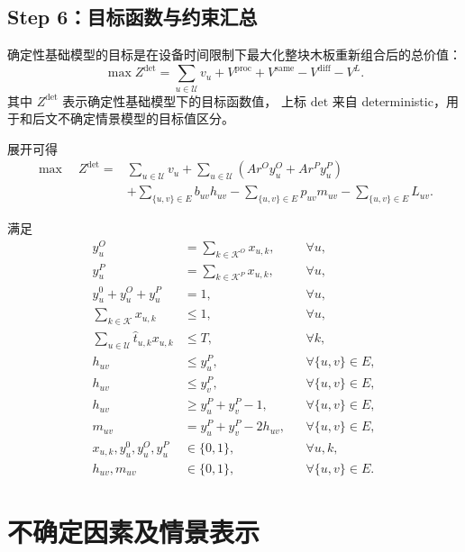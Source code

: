 ﻿\documentclass[UTF8,12pt,a4paper]{ctexart}
\begin{document}
\subsection{Step 6：目标函数与约束汇总}

\begin{description}[leftmargin=2em,labelsep=0.5em,itemsep=0.8em]
  \item[\textbf{目标函数：}]
确定性基础模型的目标是在设备时间限制下最大化整块木板重新组合后的总价值：
\[
\boxed{
\max Z^{\mathrm{det}}
=
\sum_{u\in\mathcal U}v_u
+
V^{\mathrm{proc}}
+
V^{\mathrm{same}}
-
V^{\mathrm{diff}}
-
V^L.
}
\]
其中 \(Z^{\mathrm{det}}\) 表示确定性基础模型下的目标函数值，
上标 \(\mathrm{det}\) 来自 deterministic，用于和后文不确定情景模型的目标值区分。

  \item[\textbf{展开形式：}]
展开可得
\[
\begin{aligned}
\max\quad
Z^{\mathrm{det}}
={}&
\sum_{u\in\mathcal U}v_u
+
\sum_{u\in\mathcal U}
\left(
A r^O y_u^O+A r^P y_u^P
\right)\\
&+
\sum_{\{u,v\}\in E}
b_{uv}h_{uv}
-
\sum_{\{u,v\}\in E}
p_{uv}m_{uv}
-
\sum_{\{u,v\}\in E}
L_{uv}.
\end{aligned}
\]

  \item[\textbf{约束汇总：}]
满足
\[
\begin{aligned}
y_u^O&=\sum_{k\in\mathcal K^O}x_{u,k},
&&\forall u,\\
y_u^P&=\sum_{k\in\mathcal K^P}x_{u,k},
&&\forall u,\\
y_u^0+y_u^O+y_u^P&=1,
&&\forall u,\\
\sum_{k\in\mathcal K}x_{u,k}&\le1,
&&\forall u,\\
\sum_{u\in\mathcal U}\widehat t_{u,k}x_{u,k}&\le T,
&&\forall k,\\
h_{uv}&\le y_u^P,
&&\forall\{u,v\}\in E,\\
h_{uv}&\le y_v^P,
&&\forall\{u,v\}\in E,\\
h_{uv}&\ge y_u^P+y_v^P-1,
&&\forall\{u,v\}\in E,\\
m_{uv}&=y_u^P+y_v^P-2h_{uv},
&&\forall\{u,v\}\in E,\\
x_{u,k},y_u^0,y_u^O,y_u^P&\in\{0,1\},
&&\forall u,k,\\
h_{uv},m_{uv}&\in\{0,1\},
&&\forall\{u,v\}\in E.
\end{aligned}
\]
\end{description}

\section{不确定因素及情景表示}
\end{document}
